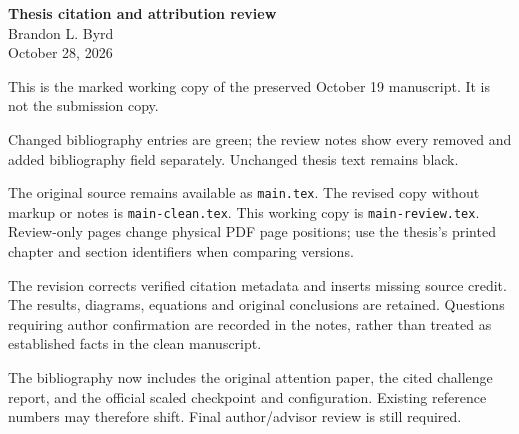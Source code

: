 \hypersetup{pageanchor=false}
\begin{titlepage}
\thispagestyle{empty}
\begin{center}
{\Large\bfseries Thesis citation and attribution review}\\[12pt]
Brandon L. Byrd\\
October 28, 2026
\end{center}
\vspace{18pt}
This is the marked working copy of the preserved October 19 manuscript. It is not the submission copy.

  Changed bibliography entries are green; the review notes show every removed and added bibliography field separately. Unchanged thesis text remains black.

The original source remains available as \texttt{main.tex}. The revised copy without markup or notes is \texttt{main-clean.tex}. This working copy is \texttt{main-review.tex}. Review-only pages change physical PDF page positions; use the thesis's printed chapter and section identifiers when comparing versions.

The revision corrects verified citation metadata and inserts missing source credit. The results, diagrams, equations and original conclusions are retained. Questions requiring author confirmation are recorded in the notes, rather than treated as established facts in the clean manuscript.

The bibliography now includes the original attention paper, the cited challenge report, and the official scaled checkpoint and configuration. Existing reference numbers may therefore shift. Final author/advisor review is still required.
\end{titlepage}

